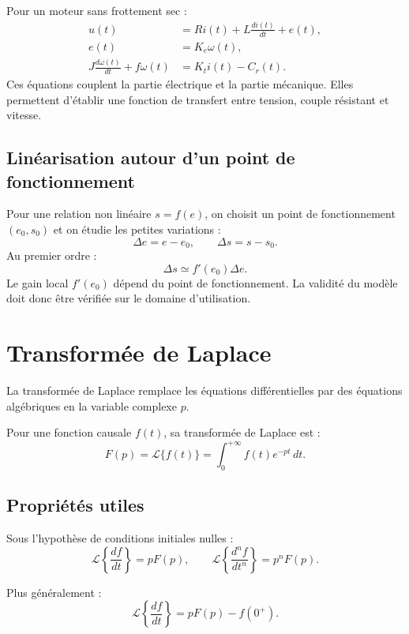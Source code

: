 \begin{SAapplication}[title={Moteur à courant continu simplifié}]
Pour un moteur sans frottement sec :
\[
\begin{aligned}
 u(t)&=R i(t)+L\frac{di(t)}{dt}+e(t),\\
 e(t)&=K_e\omega(t),\\
 J\frac{d\omega(t)}{dt}+f\omega(t)&=K_t i(t)-C_r(t).
\end{aligned}
\]
Ces équations couplent la partie électrique et la partie mécanique. Elles permettent d'établir une fonction de transfert entre tension, couple résistant et vitesse.
\end{SAapplication}

\subsection{Linéarisation autour d'un point de fonctionnement}

Pour une relation non linéaire $s=f(e)$, on choisit un point de fonctionnement $(e_0,s_0)$ et on étudie les petites variations :
\[
\Delta e=e-e_0,\qquad \Delta s=s-s_0.
\]
Au premier ordre :
\[
\Delta s\simeq f'(e_0)\Delta e.
\]
Le gain local $f'(e_0)$ dépend du point de fonctionnement. La validité du modèle doit donc être vérifiée sur le domaine d'utilisation.

\section{Transformée de Laplace}\label{sec:sa-laplace}

La transformée de Laplace remplace les équations différentielles par des équations algébriques en la variable complexe $p$.

\begin{SAdefinition}
Pour une fonction causale $f(t)$, sa transformée de Laplace est :
\[
F(p)=\mathcal{L}\{f(t)\}=\int_0^{+\infty}f(t)e^{-pt}\,dt.
\]
\end{SAdefinition}

\subsection{Propriétés utiles}

Sous l'hypothèse de conditions initiales nulles :
\[
\mathcal{L}\left\{\frac{df}{dt}\right\}=pF(p),\qquad
\mathcal{L}\left\{\frac{d^n f}{dt^n}\right\}=p^nF(p).
\]

Plus généralement :
\[
\mathcal{L}\left\{\frac{df}{dt}\right\}=pF(p)-f(0^+).
\]


